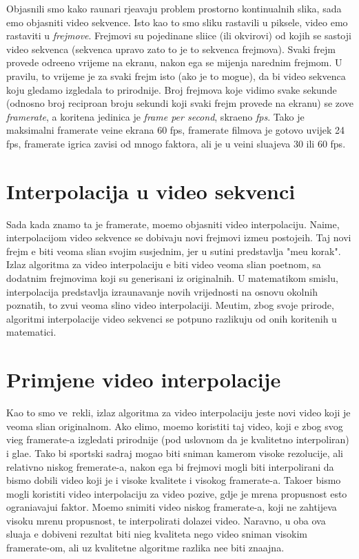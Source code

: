 Objasnili smo kako ra\ch unari rje\sh avaju problem prostorno kontinualnih slika, sada \cj emo objasniti video sekvence. Isto kao \sh to smo sliku rastavili u piksele, video \cj emo rastaviti u \textit{frejmove}. Frejmovi su pojedina\ch ne sli\ch ice (ili okvirovi)
od kojih se sastoji video sekvenca (sekvenca upravo zato \sh to je to sekvenca frejmova). Svaki frejm provede odre\dj eno vrijeme na ekranu, nakon \ch ega se mijenja narednim frejmom. U pravilu, to vrijeme je za svaki frejm isto (ako je to mogu\cj e), da
bi video sekvenca koju gledamo izgledala \sh to prirodnije. Broj frejmova koje vidimo svake sekunde (odnosno broj recipro\ch an broju sekundi koji svaki frejm provede na ekranu) se zove \textit{framerate}, a kori\sh tena jedinica je \textit{frame per second}, 
skra\cj eno \textit{fps}. Tako je maksimalni framerate ve\cj ine ekrana 60 fps, framerate filmova je gotovo uvijek 24 fps, framerate igrica zavisi od mnogo faktora, ali je u ve\cj ini slu\ch ajeva 30 ili 60 fps.

\section{Interpolacija u video sekvenci}
Sada kada znamo \sh ta je framerate, mo\zh emo objasniti video interpolaciju. Naime, interpolacijom video sekvence se dobivaju novi frejmovi izme\dj u postoje\cj ih. Taj novi frejm \cj e biti veoma sli\ch an svojim susjednim, jer u su\sh tini predstavlja
"me\dj u korak". Izlaz algoritma za video interpolaciju \cj e biti video veoma sli\ch an po\ch etnom, sa dodatnim frejmovima koji su generisani iz originalnih. U matemati\ch kom smislu, interpolacija predstavlja izra\ch unavanje novih vrijednosti na osnovu
okolnih poznatih, \sh to zvu\ch i veoma sli\ch no video interpolaciji. Me\dj utim, zbog svoje prirode, algoritmi interpolacije video sekvenci se potpuno razlikuju od onih kori\sh tenih u matematici.

\section{Primjene video interpolacije}
Kao \sh to smo ve\cj\ rekli, izlaz algoritma za video interpolaciju jeste novi video koji je veoma sli\ch an originalnom. Ako \zh elimo, mo\zh emo koristiti taj video, koji \cj e zbog svog vi\sh eg framerate-a izgledati prirodnije (pod uslovnom da je kvalitetno
interpoliran) i gla\dj e. Tako bi sportski sadr\zh aj mogao biti sniman kamerom visoke rezolucije, ali relativno niskog fremerate-a, nakon \ch ega bi frejmovi mogli biti interpolirani da bismo dobili video koji je i visoke kvalitete i visokog framerate-a.
Tako\dj er bismo mogli koristiti video interpolaciju za video pozive, gdje je mre\zh na propusnost \ch esto ograni\ch avaju\cj i faktor. Mo\zh emo snimiti video niskog framerate-a, koji ne zahtijeva visoku mre\zh nu propusnost, te interpolirati
dolaze\cj i video. Naravno, u oba ova slu\ch aja \cj e dobiveni rezultat biti ni\zh eg kvaliteta nego video sniman visokim framerate-om, ali uz kvalitetne algoritme razlika ne\cj e biti zna\ch ajna.

